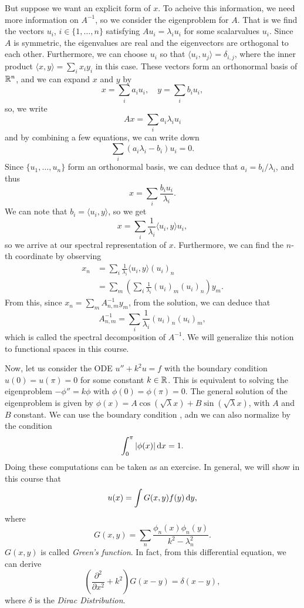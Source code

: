 \documentclass{article}
\begin{document}
But suppose we want an explicit form of $x$. To acheive this information, we need more information on $A^{-1}$, so we consider the eigenproblem for $A$. That is we find the vectors $u_i$, $i \in \{1, \hdots, n\}$ satisfying $Au_i = \lambda_i u_i$ for some scalarvalues $u_i$. Since $A$ is symmetric, the eigenvalues are real and the eigenvectors are orthogonal to each other. Furthermore, we can choose $u_i$ so that $\langle u_i, u_j \rangle = \delta_{i, j}$, where the inner product $\langle x, y\rangle = \sum_i x_i y_i$ in this case. These vectors form an orthonormal basis of $\mathbb{R}^n$, and we can expand $x$ and $y$ by
    \[
        x = \sum_i a_i u_i, \quad y = \sum_i b_i u_i, 
    \]
so, we write
    \[
        Ax = \sum_i a_i \lambda_i u_i 
    \]
and by combining a few equations, we can write down
    \[
        \sum_i (a_i \lambda_i - b_i) u_i = 0.
    \]
Since $\{u_1, \hdots, u_n\}$ form an orthonormal basis, we can deduce that $a_i = b_i / \lambda_i$, and thus 
    \[
        x = \sum_i \frac{b_i u_i}{\lambda_i}.
    \]
We can note that $b_i = \langle u_i, y \rangle$, so we get
    \[
        x = \sum_i \frac{1}{\lambda_i} \langle u_i, y \rangle u_i,
    \]
so we arrive at our spectral representation of $x$. Furthermore, we can find the $n$-th coordinate by observing
    \begin{align*}
        x_n &= \sum_i \frac{1}{\lambda_i} \langle u_i, y \rangle (u_i)_n \\
        &= \sum_m \left(\sum_i \frac{1}{\lambda_i} (u_i)_m (u_i)_n\right)y_m.
    \end{align*}
From this, since $x_n = \sum_m A^{-1}_{n,m} y_m$, from the solution, we can deduce that 
    \[
        A_{n, m}^{-1} = \sum_{i} \frac{1}{\lambda_i}(u_i)_n (u_i)_m,
    \]
which is called the spectral decomposition of $A^{-1}$. We will generalize this notion to functional spaces in this course. 
\newpar

Now, let us consider the ODE $u'' + k^2u = f$ with the boundary condition $u(0) = u(\pi) = 0$ for some constant $k \in \mathbb{R}$. This is equivalent to solving the eigenproblem $-\phi'' = k \phi$ with $\phi(0) = \phi(\pi) = 0$. The general solution of the eigenproblem is given by $\phi(x) = A \cos(\sqrt{\lambda}x) + B \sin(\sqrt{\lambda} x)$, with $A$ and $B$ constant. We can use the boundary condition , adn we can also normalize by the condition 
    \[
        \int_0^\pi |\phi(x)| \, \text{d}x = 1.
    \]
Doing these computations can be taken as an exercise. In general, we will show in this course that 
    \[
        u(x) = \int G(x, y) f(y) \, \text{d}y,
    \]
where 
    \[
        G(x, y) = \sum_n \frac{\phi_n(x) \phi_n(y)}{k^2 - \lambda_n^2}.
    \]
$G(x, y)$ is called \textit{Green's function}. In fact, from this differential equation, we can derive
    \[
        \left( \frac{\partial^2}{\partial x^2} + k^2\right)G(x - y) = \delta(x - y),
    \]
where $\delta$ is the \textit{Dirac Distribution}.
\end{document}

